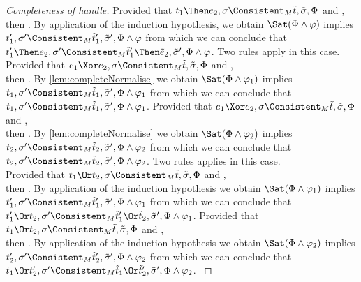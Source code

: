 \begin{proof}[Completeness of handle]
    {
    Provided that $t_1\Then e_2,\sigma\Consistent_{M}\tilde{t},\tilde{\sigma},\Phi$ and ,
    then .
    By application of the induction hypothesis, we obtain $\Sat(\Phi\land\phi)$ implies $t_1',\sigma'\Consistent_{M}\tilde{t}_1',\tilde{\sigma}',\Phi\land\phi$
    from which we can conclude that $t_1'\Then e_2,\sigma'\Consistent_{M}\tilde{t}_1'\Then \tilde{e}_2,\tilde{\sigma}',\Phi\land\phi$.
    }
    {
    Two rules apply in this case.\\
      {
      Provided that $e_1\Xor e_2,\sigma\Consistent_{M}\tilde{t},\tilde{\sigma},\Phi$ and ,\\
      then .
      By \cref{lem:completeNormalise} we obtain $\Sat(\Phi\land\phi_1)$ implies $t_1,\sigma'\Consistent_{M}\tilde{t}_1,\tilde{\sigma}',\Phi\land\phi_1$
      from which we can conclude that $t_1,\sigma'\Consistent_{M}\tilde{t}_1,\tilde{\sigma}',\Phi\land\phi_1$.
      }
      {
      Provided that $e_1\Xor e_2,\sigma\Consistent_{M}\tilde{t},\tilde{\sigma},\Phi$ and ,\\
      then .
      By \cref{lem:completeNormalise} we obtain $\Sat(\Phi\land\phi_2)$ implies $t_2,\sigma'\Consistent_{M}\tilde{t}_2,\tilde{\sigma}',\Phi\land\phi_2$
      from which we can conclude that $t_2,\sigma'\Consistent_{M}\tilde{t}_2,\tilde{\sigma}',\Phi\land\phi_2$.
      }
    }
      {
      Two rules applies in this case.\\
      {
      Provided that $t_1\Or t_2,\sigma\Consistent_{M}\tilde{t},\tilde{\sigma},\Phi$ and ,\\
      then .
      By application of the induction hypothesis we obtain $\Sat(\Phi\land\phi_1)$ implies $t_1',\sigma'\Consistent_{M}\tilde{t}_1',\tilde{\sigma}',\Phi\land\phi_1$
      from which we can conclude that $t_1'\Or t_2,\sigma'\Consistent_{M}\tilde{t}_1'\Or\tilde{t}_2,\tilde{\sigma}',\Phi\land\phi_1$.
      }
      {
      Provided that $t_1\Or t_2,\sigma\Consistent_{M}\tilde{t},\tilde{\sigma},\Phi$ and ,\\
      then .
      By application of the induction hypothesis we obtain $\Sat(\Phi\land\phi_2)$ implies $t_2',\sigma'\Consistent_{M}\tilde{t}_2',\tilde{\sigma}',\Phi\land\phi_2$
      from which we can conclude that $t_1\Or t_2',\sigma'\Consistent_{M}\tilde{t}_1\Or\tilde{t}_2',\tilde{\sigma}',\Phi\land\phi_2$.
}}
\end{proof}
